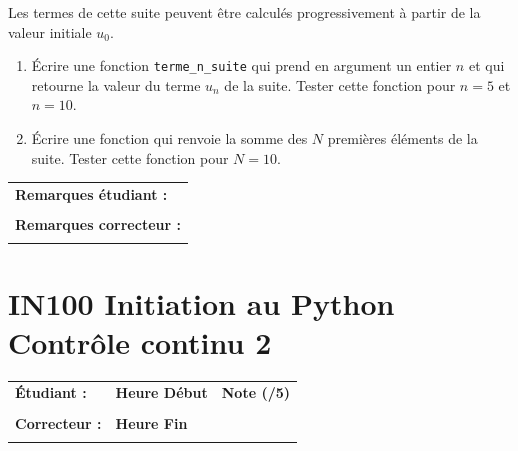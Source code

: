 \documentclass[a4paper,11pt]{article}
\begin{document}
Les termes de cette suite peuvent être calculés progressivement à partir de la valeur initiale $u_0$.


\begin{enumerate}


\item[1.] Écrire une fonction \texttt{terme\_n\_suite} qui prend en argument  un entier $n$ et qui retourne la valeur du terme $u_n$ de la suite. Tester cette fonction pour $n=5$ et $n=10$. 

\item[2.] Écrire une fonction qui renvoie la somme des $N$ premières éléments de la suite. 
Tester cette fonction pour $N=10$. 

\end{enumerate}


\vspace{0.5 cm}
\begin{table}[h!]
\centering
\renewcommand{\arraystretch}{1.4} %
\begin{tabular}{|p{15cm}|}
\hline
\textbf{Remarques étudiant :}    \\
 \\
\hline
\textbf{Remarques correcteur :}  \\
 \\
\hline
\end{tabular}
\end{table}

\newpage


\section*{\center IN100 Initiation au Python\\
Contrôle continu 2}

\vspace{0.5 cm}

\begin{table}[h!]
\centering
\renewcommand{\arraystretch}{1.4} %
\begin{tabular}{|p{10cm}|p{3cm}|p{2cm}|}
\hline
\textbf{Étudiant :} & \textbf{Heure Début }  & \textbf{Note (/5) }  \\
& & \\
\hline
\textbf{Correcteur :} & \textbf{Heure Fin } & \\
& & \\
\hline

\hline
\end{tabular}
\end{table}
\vspace{0.5 cm}
\end{document}
